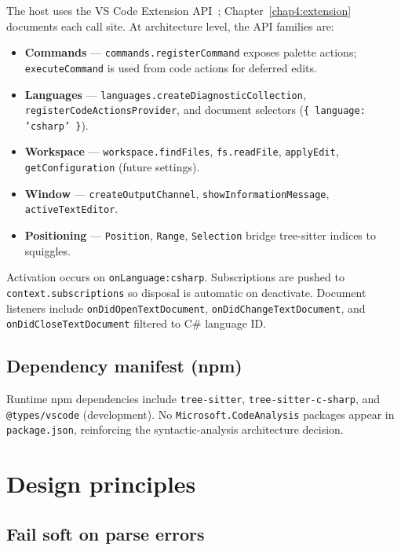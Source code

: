 The host uses the VS Code Extension API~\cite{vscode-api}; Chapter~\ref{chap4:extension} documents each call site. At architecture level, the API families are:
\begin{itemize}
	\item \textbf{Commands} --- \texttt{commands.registerCommand} exposes palette actions; \texttt{executeCommand} is used from code actions for deferred edits.
	\item \textbf{Languages} --- \texttt{languages.createDiagnosticCollection}, \texttt{registerCodeActionsProvider}, and document selectors (\texttt{\{ language: 'csharp' \}}).
	\item \textbf{Workspace} --- \texttt{workspace.findFiles}, \texttt{fs.readFile}, \texttt{applyEdit}, \texttt{getConfiguration} (future settings).
	\item \textbf{Window} --- \texttt{createOutputChannel}, \texttt{showInformationMessage}, \texttt{activeTextEditor}.
	\item \textbf{Positioning} --- \texttt{Position}, \texttt{Range}, \texttt{Selection} bridge tree-sitter indices to squiggles.
\end{itemize}

Activation occurs on \texttt{onLanguage:csharp}. Subscriptions are pushed to \texttt{context.subscriptions} so disposal is automatic on deactivate. Document listeners include \texttt{onDidOpenTextDocument}, \texttt{onDidChangeTextDocument}, and \texttt{onDidCloseTextDocument} filtered to C\# language ID.

\subsection{Dependency manifest (npm)}

Runtime npm dependencies include \texttt{tree-sitter}, \texttt{tree-sitter-c-sharp}, and \texttt{@types/vscode} (development). No \texttt{Microsoft.CodeAnalysis} packages appear in \texttt{package.json}, reinforcing the syntactic-analysis architecture decision.

\section{Design principles}
\label{chap2:design}

\subsection{Fail soft on parse errors}

